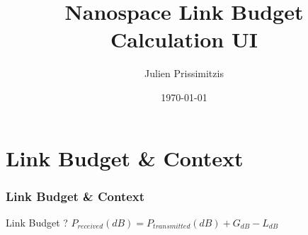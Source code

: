 \documentclass[11pt]{beamer}
\title{Nanospace Link Budget Calculation UI}
\subtitle{}
\author{Julien Prissimitzis}
\date{\today}
\begin{document}

\begin{frame}
	\titlepage
\end{frame}

\section{Link Budget \& Context}

\begin{frame}
	\frametitle{Link Budget \& Context}


	\begin{block}{Link Budget ?}
	  $P_{received}(dB) = P_{transmitted}(dB) + G_{dB} - L_{dB}$
	\end{block}



\end{frame}
\end{document}
